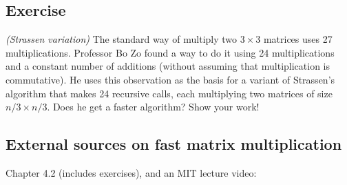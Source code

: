 \subsection{Exercise}

\exercise\emph{(Strassen variation)}
The standard way of multiply two $3\times 3$ matrices uses 27 multiplications.
Professor Bo Zo found a way to do it using 24
multiplications and a constant number of additions
(without assuming that multiplication is commutative).
He uses this observation as the basis for a variant of Strassen's algorithm
that makes 24 recursive calls, each multiplying two matrices of size $n/3 \times n/3$.
Does he get a faster algorithm?
Show your work!

\subsection{External sources on fast matrix multiplication}

\begin{mylist}[-]

\item \CLRS Chapter 4.2 (includes exercises), and an MIT lecture video:
  

\end{mylist}



